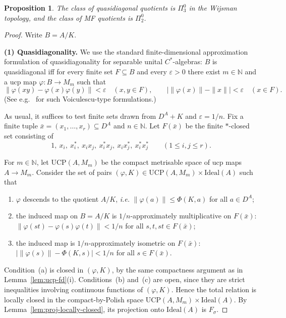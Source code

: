 \documentclass[12pt,fleqn,a4paper]{amsart}
\renewcommand{\le}{\leqslant}
\numberwithin{equation}{section}
\newtheorem{proposition}[theorem]{Proposition}
\theoremstyle{definition}
\newcommand{\N}{\mathbb{N}}
\newcommand{\Ideal}{\mathrm{Ideal}}
\begin{document}
\begin{proposition}\label{prop:QD-MF}
The class of quasidiagonal quotients is $\Pi^0_3$ in the Wijsman topology, and the
class of MF quotients is $\Pi^0_2$.
\end{proposition}

\begin{proof}
Write $B=A/K$.

\smallskip
\noindent\textbf{(1) Quasidiagonality.}
We use the standard finite-dimensional approximation formulation of
quasidiagonality for separable unital $C^*$-algebras:
$B$ is quasidiagonal iff for every finite set $F\subseteq B$ and every
$\varepsilon>0$ there exist $m\in\N$ and a ucp map $\varphi:B\to M_m$ such that
\begin{equation}\label{eq:QD-approx}
\|\varphi(xy)-\varphi(x)\varphi(y)\|<\varepsilon\quad (x,y\in F),
\qquad
\bigl|\|\varphi(x)\|-\|x\|\bigr|<\varepsilon\quad (x\in F).
\end{equation}
(See e.g.\ \cite[V.4.2.1]{BlackadarOA} for such Voiculescu-type formulations.)

As usual, it suffices to test finite sets drawn from $D^A+K$ and
$\varepsilon=1/n$.
Fix a finite tuple $\bar x=(x_1,\dots,x_r)\subseteq D^A$ and $n\in\N$.
Let $F(\bar x)$ be the finite $*$-closed set consisting of
\[
1,\ x_i,\ x_i^*,\ x_ix_j,\ x_i^*x_j,\ x_ix_j^*,\ x_i^*x_j^*
\qquad (1\le i,j\le r).
\]

For $m\in\N$, let $\mathrm{UCP}(A,M_m)$ be the compact metrisable space of ucp
maps $A\to M_m$.
Consider the set of pairs $(\varphi,K)\in \mathrm{UCP}(A,M_m)\times\Ideal(A)$ such that

\begin{enumerate}[label=\textup{(\alph*)}]
\item $\varphi$ descends to the quotient $A/K$, \emph{i.e.}
$\|\varphi(a)\|\le \Phi(K,a)$ for all $a\in D^A$;
\item the induced map on $B=A/K$ is $1/n$-approximately multiplicative on
$F(\bar x)$:
$\|\varphi(st)-\varphi(s)\varphi(t)\|<1/n$ for all $s,t,st\in F(\bar x)$;
\item the induced map is $1/n$-approximately isometric on $F(\bar x)$:
$\bigl|\|\varphi(s)\|-\Phi(K,s)\bigr|<1/n$ for all $s\in F(\bar x)$.
\end{enumerate}

Condition~(a) is closed in $(\varphi,K)$, by the same compactness argument as in
Lemma~\ref{lem:ucp-fd}(i).
Conditions~(b) and~(c) are open, since they are strict inequalities involving
continuous functions of $(\varphi,K)$.
Hence the total relation is locally closed in the compact-by-Polish space
$\mathrm{UCP}(A,M_m)\times\Ideal(A)$.
By Lemma~\ref{lem:proj-locally-closed}, its projection onto $\Ideal(A)$ is
$F_\sigma$.


\end{proof}
\end{document}
